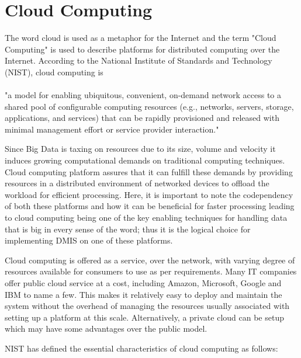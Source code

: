 \section{Cloud Computing}

The word cloud is used as a metaphor for the Internet and the term "Cloud Computing" is used to describe platforms for distributed computing over the Internet. According to the National Institute of Standards and Technology (NIST), cloud computing is
\\
\\
"a model for enabling ubiquitous, convenient, on-demand network access to a shared pool of configurable computing resources (e.g., networks, servers, storage, applications, and services) that can be rapidly provisioned and released with minimal management effort or service provider interaction."

\hfill

Since Big Data is taxing on resources due to its size, volume and velocity it induces growing computational demands on traditional computing techniques. Cloud computing platform assures that it can fulfill these demands by providing resources in a distributed environment of networked devices to offload the workload for efficient processing. Here, it is important to note the codependency of both these platforms and how it can be beneficial for faster processing leading to cloud computing being one of the key enabling techniques for handling data that is big in every sense of the word; thus it is the logical choice for implementing DMIS on one of these platforms.

Cloud computing is offered as a service, over the network, with varying degree of resources available for consumers to use as per requirements. Many IT companies offer public cloud service at a cost, including Amazon, Microsoft, Google and IBM to name a few. This makes it relatively easy to deploy and maintain the system without the overhead of managing the resources usually associated with setting up a platform at this scale. Alternatively, a private cloud can be setup which may have some advantages over the public model.

NIST has defined the essential characteristics of cloud computing as follows:

